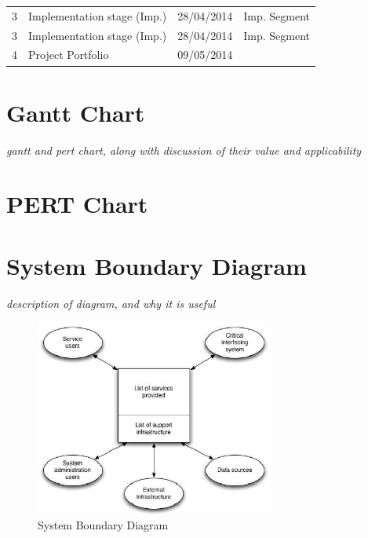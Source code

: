 \begin{tabular}{llrl}
    \midrule
    
    3        & Implementation stage (Imp.)  & 28/04/2014  & Imp. Segment      \\
    3        & Implementation stage (Imp.)  & 28/04/2014  & Imp. Segment      \\
    
    
    \midrule
    
    4        & Project Portfolio            & 09/05/2014  &  \\
    
    
    
    \bottomrule

\end{tabular}


\section{Gantt Chart}
\textit{gantt and pert chart, along with discussion of their value and
applicability}


\section{PERT Chart}


\section{System Boundary Diagram}
\textit{description of diagram, and why it is useful}
\begin{figure}[h]
    \centering
    \includegraphics[width=0.7\textwidth]{images/requirements/system_boundary_diagram.png}
    \caption{System Boundary Diagram}
    \label{fig:sys_boundary_diag}
\end{figure}
